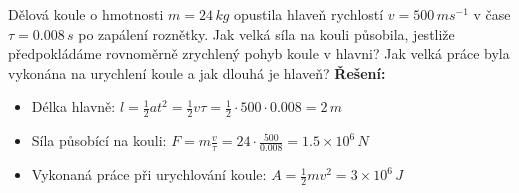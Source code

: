   \begin{example} Dělová koule o hmotnosti $m = 24\,kg$ opustila hlaveň rychlostí $v = 
    500\,ms^{-1}$ v čase $\tau=0.008\,s$ po zapálení roznětky. Jak velká síla na kouli působila, 
    jestliže předpokládáme rovnoměrně zrychlený pohyb koule v hlavni? Jak velká práce byla vykonána 
    na urychlení koule a jak dlouhá je hlaveň?\newline
    \textbf{Řešení:}
    \begin{itemize}
      \item Délka hlavně: $l=\frac{1}{2}at^2=\frac{1}{2}v\tau=\frac{1}{2}\cdot500\cdot0.008=2\,m$
      \item Síla působící na kouli: $F=m\frac{v}{\tau}=24\cdot\frac{500}{0.008}=1.5\times10^6\,N$
      \item Vykonaná práce při urychlování koule: $A=\frac{1}{2}mv^2=3\times10^6\,J$
    \end{itemize}
  \end{example} 